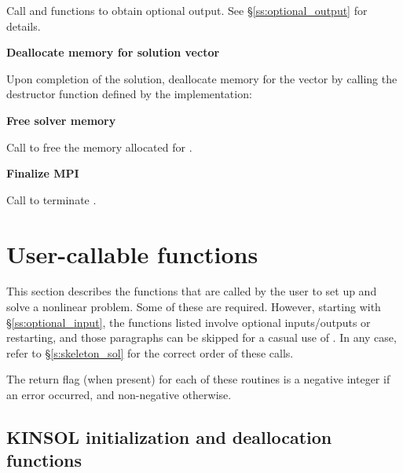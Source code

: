 \begin{Steps}
  Call  and  functions to obtain optional output.
  See \S\ref{ss:optional_output} for details.

\item
  {\bf Deallocate memory for solution vector}

  Upon completion of the solution, deallocate memory for the vector 
  by calling the destructor function defined by the {\nvector} implementation:

  {\s} 

  {\p} 
  
\item
  {\bf Free solver memory}

  Call  to free the memory allocated for {\kinsol}.
  
\item 
  {\bf {\p} Finalize MPI}

  Call  to terminate {\mpi}.
  
\end{Steps}


\section{User-callable functions}\label{s:kinsol_fct_sol}

This section describes the {\kinsol} functions that are called by the
user to set up and solve a nonlinear problem. Some of these are required. 
However, starting with \S\ref{ss:optional_input}, the functions listed involve
optional inputs/outputs or restarting, and those paragraphs can be
skipped for a casual use of {\kinsol}. In any case, refer to
\S\ref{s:skeleton_sol} for the correct order of these calls.

The return flag (when present) for each of these routines is a
negative integer if an error occurred, and non-negative otherwise.


\subsection{KINSOL initialization and deallocation functions}
\label{sss:kinmalloc}

